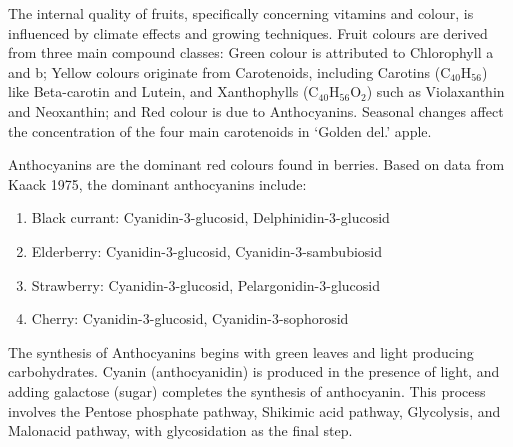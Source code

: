 \vspace{1em}
The internal quality of fruits, specifically concerning vitamins and colour, is influenced by climate effects and growing techniques. Fruit colours are derived from three main compound classes: Green colour is attributed to Chlorophyll a and b; Yellow colours originate from Carotenoids, including Carotins (C$_40$H$_56$) like Beta-carotin and Lutein, and Xanthophylls (C$_40$H$_56$O$_2$) such as Violaxanthin and Neoxanthin; and Red colour is due to Anthocyanins. Seasonal changes affect the concentration of the four main carotenoids in ‘Golden del.' apple.

\vspace{0.5em}
Anthocyanins are the dominant red colours found in berries. Based on data from Kaack 1975, the dominant anthocyanins include: 

\begin{enumerate} 
    \item Black currant: Cyanidin-3-glucosid, Delphinidin-3-glucosid 
    \item Elderberry: Cyanidin-3-glucosid, Cyanidin-3-sambubiosid 
    \item Strawberry: Cyanidin-3-glucosid, Pelargonidin-3-glucosid 
    \item Cherry: Cyanidin-3-glucosid, Cyanidin-3-sophorosid 
\end{enumerate} 

\vspace{0.5em}
The synthesis of Anthocyanins begins with green leaves and light producing carbohydrates. Cyanin (anthocyanidin) is produced in the presence of light, and adding galactose (sugar) completes the synthesis of anthocyanin. This process involves the Pentose phosphate pathway, Shikimic acid pathway, Glycolysis, and Malonacid pathway, with glycosidation as the final step.

